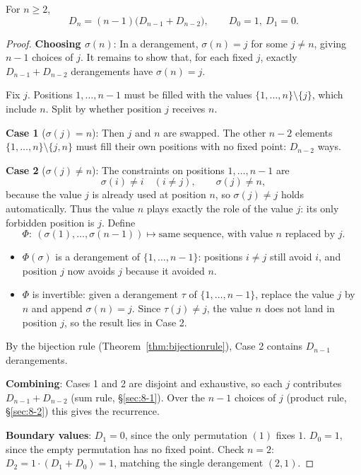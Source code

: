 \begin{proposition}[Recurrence]
\label{thm:derangerec}
For $n\ge2$,
\[
D_n = (n-1)\big(D_{n-1}+D_{n-2}\big), \qquad D_0=1,\ D_1=0.
\]
\end{proposition}
\begin{proof}
\textbf{Choosing $\sigma(n)$}: In a derangement, $\sigma(n)=j$ for some $j\ne n$, giving $n-1$ choices of $j$. It remains to show that, for each fixed $j$, exactly $D_{n-1}+D_{n-2}$ derangements have $\sigma(n)=j$.

Fix $j$. Positions $1,\dots,n-1$ must be filled with the values $\{1,\dots,n\}\setminus\{j\}$, which include $n$. Split by whether position $j$ receives $n$.

\textbf{Case 1} ($\sigma(j)=n$): Then $j$ and $n$ are swapped. The other $n-2$ elements $\{1,\dots,n\}\setminus\{j,n\}$ must fill their own positions with no fixed point: $D_{n-2}$ ways.

\textbf{Case 2} ($\sigma(j)\ne n$): The constraints on positions $1,\dots,n-1$ are
\[
\sigma(i)\ne i\quad (i\ne j), \qquad \sigma(j)\ne n,
\]
because the value $j$ is already used at position $n$, so $\sigma(j)\ne j$ holds automatically. Thus the value $n$ plays exactly the role of the value $j$: its only forbidden position is $j$. Define
\[
\Phi:\ (\sigma(1),\dots,\sigma(n-1)) \longmapsto \text{same sequence, with value } n \text{ replaced by } j.
\]
\begin{itemize}
  \item $\Phi(\sigma)$ is a derangement of $\{1,\dots,n-1\}$: positions $i\ne j$ still avoid $i$, and position $j$ now avoids $j$ because it avoided $n$.
  \item $\Phi$ is invertible: given a derangement $\tau$ of $\{1,\dots,n-1\}$, replace the value $j$ by $n$ and append $\sigma(n)=j$. Since $\tau(j)\ne j$, the value $n$ does not land in position $j$, so the result lies in Case 2.
\end{itemize}
By the bijection rule (Theorem~\ref{thm:bijectionrule}), Case 2 contains $D_{n-1}$ derangements.

\textbf{Combining}: Cases 1 and 2 are disjoint and exhaustive, so each $j$ contributes $D_{n-1}+D_{n-2}$ (sum rule, \S\ref{sec:8-1}). Over the $n-1$ choices of $j$ (product rule, \S\ref{sec:8-2}) this gives the recurrence.

\textbf{Boundary values}: $D_1=0$, since the only permutation $(1)$ fixes $1$. $D_0=1$, since the empty permutation has no fixed point. Check $n=2$: $D_2=1\cdot(D_1+D_0)=1$, matching the single derangement $(2,1)$.
\end{proof}

